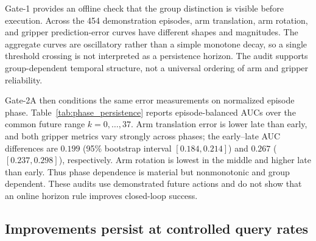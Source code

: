Gate-1 provides an offline check that the group distinction is visible before
execution.  Across the 454 demonstration episodes, arm translation, arm
rotation, and gripper prediction-error curves have different shapes and
magnitudes.  The aggregate curves are oscillatory rather than a simple
monotone decay, so a single threshold crossing is not interpreted as a
persistence horizon.  The audit supports group-dependent temporal structure,
not a universal ordering of arm and gripper reliability.

Gate-2A then conditions the same error measurements on normalized episode phase.
Table~\ref{tab:phase_persistence} reports episode-balanced AUCs over the common
future range $k=0,\ldots,37$.  Arm translation error is lower late than early,
and both gripper metrics vary strongly across phases; the early--late AUC
differences are $0.199$ (95\% bootstrap interval $[0.184,0.214]$) and $0.267$
($[0.237,0.298]$), respectively.  Arm rotation is lowest in the middle and
higher late than early.  Thus phase dependence is material but nonmonotonic and
group dependent.  These audits use demonstrated future actions and do not show
that an online horizon rule improves closed-loop success.

\begin{table}[t]
\caption{Offline phase-conditioned prediction-error AUCs.  Values are
episode-balanced over the common $k=0$--$37$ range; higher values indicate
larger prediction error.  This is a diagnostic, not a dynamic-execution result.}
\label{tab:phase_persistence}
\centering
\scriptsize
\setlength{\tabcolsep}{3.0pt}
%
\end{table}

\subsection{Improvements persist at controlled query rates}

